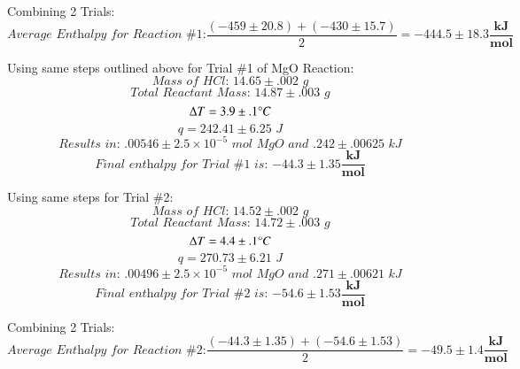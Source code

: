 \documentclass[12pt]{article}
\begin{document}
Combining 2 Trials:
\begin{equation*}
\textit{Average Enthalpy for Reaction \#1:} \frac{(-459 \pm 20.8)+(-430 \pm 15.7)}{2} = \mathbf{-444.5 \pm 18.3 \frac{kJ}{mol}}
\end{equation*}

Using same steps outlined above for Trial \#1 of MgO Reaction:
\begin{equation*}
\textit{Mass of HCl: } 14.65 \pm .002 \textit{ g}
\end{equation*}
\begin{equation*}
\textit{Total Reactant Mass: } 14.87 \pm .003 \textit{ g}
\end{equation*}
\begin{equation*}
\Delta T = 3.9 \pm .1 \degree C
\end{equation*}
\begin{equation*}
q = 242.41 \pm 6.25 \textit{ J}
\end{equation*}
\begin{equation*}
\textit{Results in: } .00546 \pm 2.5 \times 10^{-5} \textit{ mol MgO and } .242 \pm .00625 \textit{ kJ}
\end{equation*}
\begin{equation*}
\textit{Final enthalpy for Trial \#1 is: } \mathbf{-44.3 \pm 1.35 \frac{kJ}{mol}}
\end{equation*}

Using same steps for Trial \#2:
\begin{equation*}
\textit{Mass of HCl: } 14.52 \pm .002 \textit{ g}
\end{equation*}
\begin{equation*}
\textit{Total Reactant Mass: } 14.72 \pm .003 \textit{ g}
\end{equation*}
\begin{equation*}
\Delta T = 4.4 \pm .1 \degree C
\end{equation*}
\begin{equation*}
q = 270.73 \pm 6.21 \textit{ J}
\end{equation*}
\begin{equation*}
\textit{Results in: } .00496 \pm 2.5 \times 10^{-5} \textit{ mol MgO and } .271 \pm .00621 \textit{ kJ}
\end{equation*}
\begin{equation*}
\textit{Final enthalpy for Trial \#2 is: } \mathbf{-54.6 \pm 1.53 \frac{kJ}{mol}}
\end{equation*}

Combining 2 Trials:
\begin{equation*}
\textit{Average Enthalpy for Reaction \#2:} \frac{(-44.3 \pm 1.35)+(-54.6 \pm 1.53)}{2} = \mathbf{-49.5 \pm 1.4 \frac{kJ}{mol}}
\end{equation*}
\end{document}
